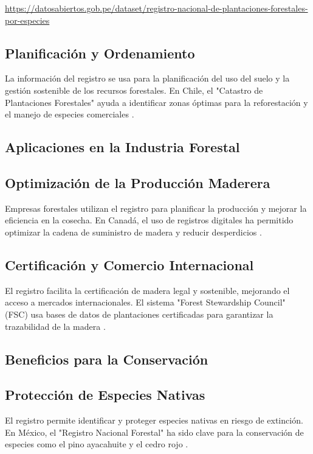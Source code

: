 \begin{center}
	\url{https://datosabiertos.gob.pe/dataset/registro-nacional-de-plantaciones-forestales-por-especies}
\end{center}

\subsection{Planificación y Ordenamiento}
La información del registro se usa para la planificación del uso del suelo y la gestión sostenible de los recursos forestales. En Chile, el "Catastro de Plantaciones Forestales" ayuda a identificar zonas óptimas para la reforestación y el manejo de especies comerciales \cite{catastrochile2022}.

\subsection{Aplicaciones en la Industria Forestal}
\subsection{Optimización de la Producción Maderera}
Empresas forestales utilizan el registro para planificar la producción y mejorar la eficiencia en la cosecha. En Canadá, el uso de registros digitales ha permitido optimizar la cadena de suministro de madera y reducir desperdicios \cite{canadaforest2023}.

\subsection{Certificación y Comercio Internacional}
El registro facilita la certificación de madera legal y sostenible, mejorando el acceso a mercados internacionales. El sistema "Forest Stewardship Council" (FSC) usa bases de datos de plantaciones certificadas para garantizar la trazabilidad de la madera \cite{fsc2021}.

\subsection{Beneficios para la Conservación}
\subsection{Protección de Especies Nativas}
El registro permite identificar y proteger especies nativas en riesgo de extinción. En México, el "Registro Nacional Forestal" ha sido clave para la conservación de especies como el pino ayacahuite y el cedro rojo \cite{mexicoforest2020}.


